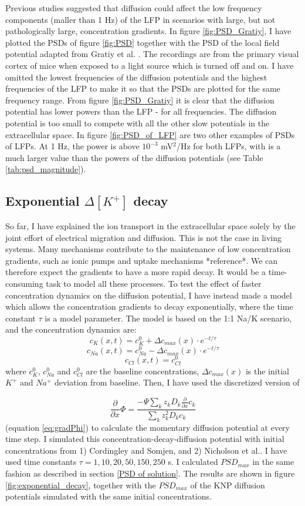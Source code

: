 \documentclass{article}
\begin{document}
Previous studies suggested that diffusion could affect the low frequency components (maller than 1 Hz) of the LFP in scenarios with large, but not pathologically large, concentration gradients. In figure \ref{fig:PSD_Gratiy}, I have plotted the PSDs of figure \ref{fig:PSD} together with the PSD of the local field potential adapted from Gratiy et al. \cite{Gratiy2017}. The recordings are from the primary visual cortex of mice when exposed to a light source which is turned off and on. I have omitted the lowest frequencies of the diffusion potentials and the highest frequencies of the LFP to make it so that the PSDs are plotted for the same frequency range. From figure \ref{fig:PSD_Gratiy} it is clear that the diffusion potential has lower powers than the LFP  - for all frequencies. The diffusion potential is too small to compete with all the other slow potentials in the extracellular space. In figure \ref{fig:PSD_of_LFP} are two other examples of PSDs of LFPs. At 1 Hz, the power is above $10^{-3}$ mV$^2$/Hz for both LFPs, with is a much larger value than the powers of the diffusion potentials (see Table \ref{tab:psd_magnitude}).

\subsection{Exponential $\Delta [K^+]$ decay}\label{exponential decay}
So far, I have explained the ion transport in the extracellular space solely by the joint effort of electrical migration and diffusion. This is not the case in living systems. Many mechanisms contribute to the maintenance of low concentration gradients, such as ionic pumps and uptake mechanisms *reference*. We can therefore expect the gradients to have a more rapid decay. It would be a time-consuming task to model all these processes. To test the effect of faster concentration dynamics on the diffusion potential, I have instead made a model which allows the concentration gradients to decay exponentially, where the time constant $\tau$ is a model parameter. The model is based on the 1:1 Na/K scenario, and the concentration dynamics are:
$$
c_{K}(x,t) = c_{K}^0 +\Delta c_{max}(x) \cdot e^{-t/\tau}
$$
$$
c_{Na}(x,t) = c_{Na}^0 -\Delta c_{max}(x) \cdot e^{-t/\tau}
$$
$$
c_{Cl}(x,t) = c_{Cl}^0
$$
where $c_{K}^0$, $c_{Na}^0$ and $c_{Cl}^0$ are the baseline concentrations, $\Delta c_{max} (x)$ is the initial $K^+$ and $Na^+$ deviation from baseline. Then, I have used the discretized version of


\begin{equation*}
\frac{\partial}{\partial x} \Phi = \frac{-\Psi \sum_k z_k D_k \frac{\partial}{\partial x} c_k}{\sum_k z_k^2 D_k c_k}
\end{equation*}
(equation \ref{eq:gradPhi}) to calculate the momentary diffusion potential at every time step. I simulated this concentration-decay-diffusion potential with initial concentrations from 1) Cordingley and Somjen, and 2) Nicholson et al.. I have used time constants $\tau = 1,10,20,50, 150, 250$ s. I calculated $PSD_{max}$ in the same fashion as described in section \ref{PSD of solution}. The results are shown in figure \ref{fig:exponential_decay}, together with the $PSD_{max}$ of the KNP diffusion potentials simulated with the same initial concentrations. 
\end{document}
